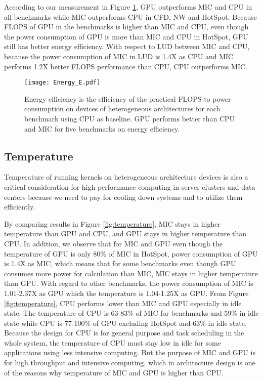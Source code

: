According to our measurement in Figure \ref{fig:energyE}, GPU outperforms MIC and CPU in all benchmarks while MIC outperforms CPU in CFD, NW and HotSpot. Because FLOPS of GPU in the benchmarks is higher than MIC and CPU, even though the power consumption of GPU is more than MIC and CPU in HotSpot, GPU still has better energy efficiency. With respect to LUD between MIC and CPU, because the power consumption of MIC in LUD is 1.4X as CPU and MIC performs 1.2X better FLOPS performance than CPU, CPU outperforms MIC.

    \begin{figure}[h!]
  \centering
  \begin{minipage}{0.5\textwidth}
    \centering
   \centering
     \texttt{[image: Energy\_E.pdf]}    
\caption{Energy efficiency is the efficiency of the practical FLOPS to power consumption on devices of heterogeneous architectures for each benchmark using CPU as baseline. GPU performs better than CPU and MIC for five benchmarks on energy efficiency.} 
\label{fig:energyE}
\end{minipage}%
\end{figure}

\subsection{Temperature}

Temperature of running kernels on heterogeneous architecture devices is also a critical consideration for high performance computing in server clusters and data centers because we need to pay for cooling down systems and to utilize them efficiently. 

By comparing results in Figure \ref{fig:temperature}, MIC stays in higher temperature than GPU and CPU, and GPU stays in higher temperature than CPU. In addition, we observe that for MIC and GPU even though the temperature of GPU is only 80\% of MIC in HotSpot, power consumption of GPU is 1.4X as MIC, which means that for some benchmarks even though GPU consumes more power for calculation than MIC, MIC stays in higher temperature than GPU. With regard to other benchmarks, the power consumption of MIC is 1.01-2.37X as GPU which the temperature is 1.04-1.25X as GPU. From Figure \ref{fig:temperature}, CPU performs lower than MIC and GPU especially in idle state. The temperature of CPU is 63-83\% of MIC for benchmarks and 59\% in idle state while CPU is 77-100\% of GPU excluding HotSpot and 63\% in idle state. Because the design for CPU is for general purpose and task scheduling in the whole system, the temperature of CPU must stay low in idle for some applications using less intensive computing. But the purpose of MIC and GPU is for high throughput and intensive computing, which in architecture design is one of the reasons why temperature of MIC and GPU is higher than CPU.

